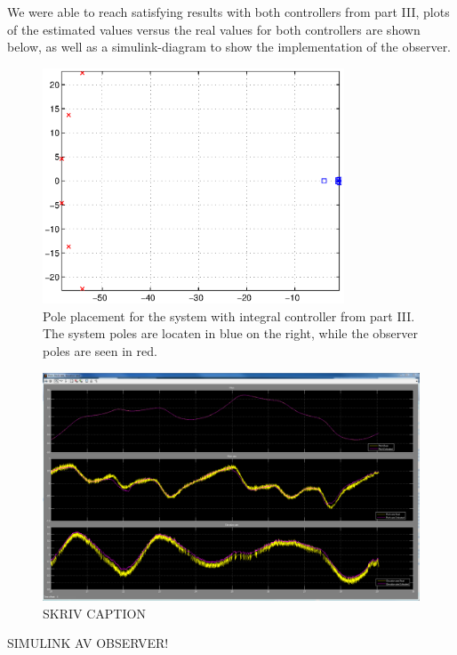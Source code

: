We were able to reach satisfying results with both controllers from part III, plots of the estimated values versus the real values for both controllers are shown below, as well as a simulink-diagram to show the implementation of the observer.
\begin{figure}[htb]
	\centering
		\includegraphics[width=0.8\textwidth]{figures/Pole_placement_P4p2_integral.eps}
	\caption{Pole placement for the system with integral controller from part III. The system poles are locaten in blue on the right, while the observer poles are seen in red.}
\label{fig:Pole_placement_P4p2}
\end{figure}
\begin{figure}[htb]
	\centering
		\includegraphics[width=1\textwidth]{figures/superplots_P4p2_del2_integrate_best.PNG}
	\caption{SKRIV CAPTION}
\label{fig:Pole_placement_P4p2}
\end{figure}

SIMULINK AV OBSERVER!

